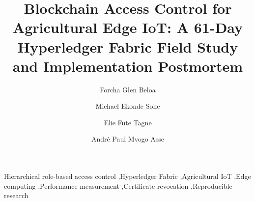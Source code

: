 \documentclass[preprint,12pt]{elsarticle}
\begin{document}
\begin{frontmatter}

\title{Blockchain Access Control for Agricultural Edge IoT: A 61-Day Hyperledger Fabric Field Study and Implementation Postmortem}

\author[buea]{Forcha Glen Beloa}
\author[buea]{Michael Ekonde Sone}
\author[buea]{Elie Fute Tagne}
\author[douala]{Andr\'e Paul Mvogo Asse}

\address[buea]{Department of Computer Engineering, Faculty of Engineering and Technology, University of Buea, Buea, Cameroon}
\address[douala]{\'Ecole Nationale Sup\'erieure Polytechnique de Douala, Universit\'e de Douala, Douala, Cameroon}

\begin{abstract}

\end{abstract}

\begin{keyword}
Hierarchical role-based access control \sep Hyperledger Fabric \sep Agricultural IoT \sep Edge computing \sep Performance measurement \sep Certificate revocation \sep Reproducible research
\end{keyword}

\end{frontmatter}













\end{document}

